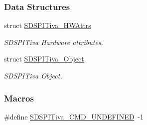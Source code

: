 \subsubsection*{Data Structures}
\begin{DoxyCompactItemize}
\item 
struct \hyperlink{struct_s_d_s_p_i_tiva___h_w_attrs}{S\-D\-S\-P\-I\-Tiva\-\_\-\-H\-W\-Attrs}
\begin{DoxyCompactList}\small\item\em S\-D\-S\-P\-I\-Tiva Hardware attributes. \end{DoxyCompactList}\item 
struct \hyperlink{struct_s_d_s_p_i_tiva___object}{S\-D\-S\-P\-I\-Tiva\-\_\-\-Object}
\begin{DoxyCompactList}\small\item\em S\-D\-S\-P\-I\-Tiva Object. \end{DoxyCompactList}\end{DoxyCompactItemize}
\subsubsection*{Macros}
\begin{DoxyCompactItemize}
\item 
\#define \hyperlink{_s_d_s_p_i_tiva_8h_a8907fed0f68cb79dcf4ebfca1c54528e}{S\-D\-S\-P\-I\-Tiva\-\_\-\-C\-M\-D\-\_\-\-U\-N\-D\-E\-F\-I\-N\-E\-D}~-\/1
\end{DoxyCompactItemize}
